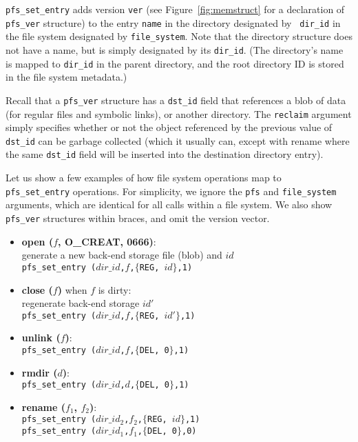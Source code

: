 {\tt pfs\_set\_entry} adds version {\tt ver} (see
Figure~\ref{fig:memstruct} for a declaration of {\tt pfs\_ver}
structure) to the entry {\tt name} in the directory designated by {\tt
  dir\_id} in the file system designated by {\tt file\_system}.  Note
that the directory structure does not have a name, but is simply
designated by its {\tt dir\_id}.  (The directory's name is mapped to
{\tt dir\_id} in the parent directory, and the root directory ID is
stored in the file system metadata.)

Recall that a \texttt{pfs\_ver} structure has a \texttt{dst\_id} field
that references a blob of data (for regular files and symbolic links),
or another directory.  The {\tt reclaim} argument simply specifies
whether or not the object referenced by the previous value of
\texttt{dst\_id} can be garbage collected (which it usually can,
except with rename where the same \texttt{dst\_id} field will be
inserted into the destination directory entry).

Let us show a few examples of how file system operations map to {\tt
pfs\_set\_entry} operations.  For simplicity, we ignore the {\tt pfs}
and {\tt file\_system} arguments, which are identical for all calls
within a file system.  We also show \texttt{pfs\_ver} structures
within braces, and omit the version vector.

\begin{itemize}
  \item \textbf{open ($f$, O\_CREAT, 0666)}: \\
    generate a new back-end storage file (blob) and $id$ \\
    {\tt pfs\_set\_entry ($dir\_id$,$f$,$\{$REG, $id$$\}$,1)}

  \item \textbf{close ($f$)} when $f$ is dirty: \\
    regenerate back-end storage $id'$ \\
    {\tt pfs\_set\_entry ($dir\_id$,$f$,$\{$REG, $id'$$\}$,1)}
    
  \item \textbf{unlink ($f$)}: \\
    {\tt pfs\_set\_entry ($dir\_id$,$f$,$\{$DEL, 0$\}$,1)}

  \item \textbf{rmdir ($d$)}: \\
    {\tt pfs\_set\_entry ($dir\_id$,$d$,$\{$DEL, 0$\}$,1)}

  \item \textbf{rename ($f_1$, $f_2$)}: \\
    {\tt pfs\_set\_entry ($dir\_id_2$,$f_2$,$\{$REG, $id$$\}$,1)} \\
    {\tt pfs\_set\_entry ($dir\_id_1$,$f_1$,$\{$DEL, 0$\}$,0)}
\end{itemize}

